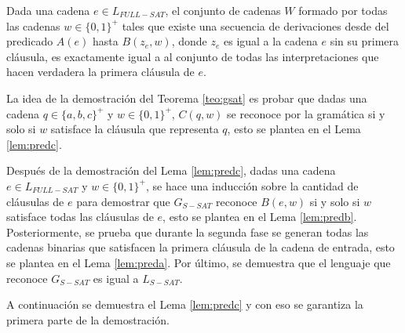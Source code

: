 \begin{lemma}
    \label{lem:preda}
    Dada una cadena $e\in L_{FULL-SAT}$, el conjunto de cadenas $W$ formado por todas las cadenas 
    $w\in \{0,1\}^+$ tales que existe una secuencia de derivaciones desde del predicado $A(e)$ hasta 
    $B(z_e,w)$, donde $z_e$ es igual a la cadena $e$ sin su primera cláusula, es exactamente igual a 
    al conjunto de todas las interpretaciones que hacen verdadera la primera cláusula de $e$.
\end{lemma}

La idea de la demostración del Teorema \ref{teo:gsat} es probar que dadas una cadena $q\in \{a,b,c\}^+$ y 
$w\in \{0,1\}^+$, $C(q,w)$ se reconoce por la gramática si y solo si $w$ satisface la cláusula que 
representa $q$, esto se plantea en el Lema \ref{lem:predc}. 

Después de la demostración del Lema \ref{lem:predc}, dadas una cadena $e\in L_{FULL-SAT}$ y $w\in \{0,1\}^+$, se hace una inducción sobre la cantidad de cláusulas de $e$ para demostrar que $G_{S-SAT}$ reconoce $B(e,w)$ si y solo si $w$ satisface todas las cláusulas de $e$, esto se plantea en el Lema \ref{lem:predb}. Posteriormente, se prueba que durante la segunda fase se generan todas las cadenas binarias que satisfacen la primera cláusula de la cadena de entrada, esto se plantea en el Lema \ref{lem:preda}. Por último, se demuestra que el lenguaje que reconoce $G_{S-SAT}$ es igual a $L_{S-SAT}$.

A continuación se demuestra el Lema \ref{lem:predc} y con eso se garantiza la primera parte de la demostración.

